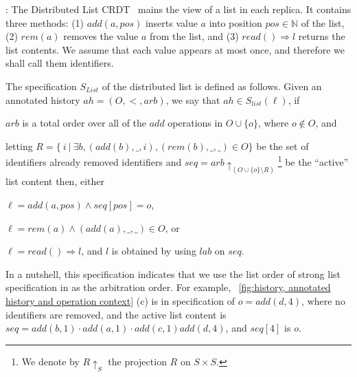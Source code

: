 \bigskip
{}: The Distributed List CRDT~\cite{Attiya:2016} mains the view of a list in each replica. It contains three methods: (1)
$\mathit{add}(a,\mathit{pos})$ inserts value $a$ into position
$\mathit{pos} \in \mathbb{N}$ of the list, (2) $\mathit{rem}(a)$ removes the
value $a$ from the list, and (3) $\mathit{read}() \Rightarrow l$
returns the list contents.
%
We assume that each value appears at most once, and therefore we shall
call them identifiers.

The specification $S_{\mathit{List}}$ of the distributed list is
defined as follows.
Given an annotated history $ah = (O,<,\mathit{arb})$, we say that $ ah
\in S_{\mathit{list}}(\ell)$, if
\begin{inparaenum}[(1)]
\item $arb$ is a total order over all of the $add$ operations in $O \cup \{ o \}$, where $o \notin O$, and
\item letting \mbox{$R = \{\ i\ |\ \exists b,
    (add(b),\_,i),(rem(b),\_,\_) \in O \}$} be the set of identifiers already removed identifiers and $\mathit{seq} =
  \mathit{arb}\!\!\!\uparrow_{( O \cup \{ o \} \setminus R)}$\footnote{We denote by $R \uparrow_{S}$ the projection $R$ on $S \times S$.} be the ``active'' list content
  then, either
    \begin{inparaenum}[(i)]
    \item $\ell = add(a,pos) \wedge \mathit{seq}[pos] = o$,
    \item $\ell = rem(a) \wedge (add(a),\_,\_) \in O$, or
    \item $\ell = read() \Rightarrow l$, and $l$ is obtained by using $\mathit{lab}$ on $\mathit{seq}$.
    \end{inparaenum}
  \end{inparaenum}
In a nutshell, this specification indicates that we use the list order
of strong list specification in \cite{Attiya:2016} as the arbitration
order.
%
For example, \figurename~\ref{fig:history, annotated history and
  operation context} (c) is in specification of $o =
\mathit{add}(d,4)$, where no identifiers are removed, and the active list content is $\mathit{seq} = \mathit{add}(b,1) \cdot \mathit{add}(a,1) \cdot \mathit{add}(c,1) \mathit{add}(d,4)$, and $\mathit{seq}[4]$ is $o$.




